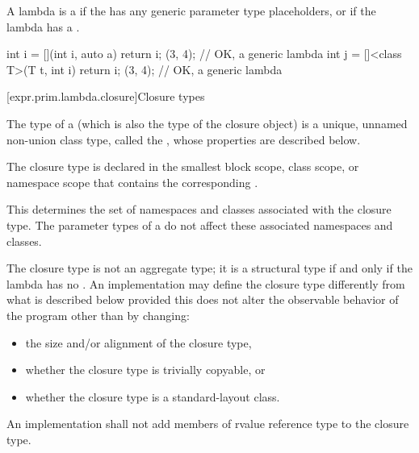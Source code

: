 \pnum
A lambda is a 
if the 
has any generic parameter type placeholders, or
if the lambda has a .
\begin{example}
\begin{codeblock}
int i = [](int i, auto a) { return i; }(3, 4);                  // OK, a generic lambda
int j = []<class T>(T t, int i) { return i; }(3, 4);            // OK, a generic lambda
\end{codeblock}
\end{example}

[expr.prim.lambda.closure]{Closure types}%

\pnum
The type of a  (which is also the type of the
closure object) is a unique, unnamed non-union class type,
called the ,
whose properties are described below.

\pnum
The closure type is declared in the smallest block
scope, class scope, or namespace scope that contains the corresponding
.
\begin{note}
This determines the set of namespaces and
classes associated with the closure type. The parameter
types of a  do not affect these associated namespaces and
classes.
\end{note}

\pnum
The closure type is not an aggregate type;
it is a structural type if and only if
the lambda has no .
An implementation may define the closure type differently from what
is described below provided this does not alter the observable behavior of the program
other than by changing:
\begin{itemize}
\item the size and/or alignment of the closure type,

\item whether the closure type is trivially copyable, or

\item whether the closure type is a standard-layout class.
\end{itemize}

An implementation shall not add members of rvalue reference type to the closure
type.

